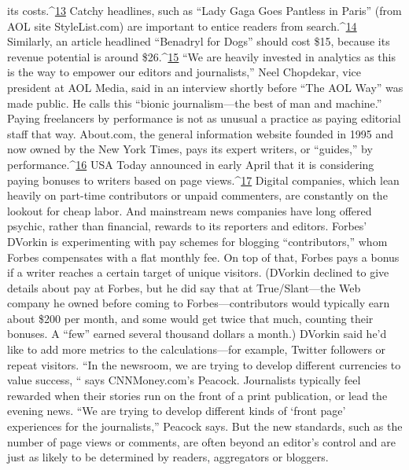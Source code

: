 its costs.^{\href{#endnotes-ch9}{13}} Catchy headlines, such as ``Lady Gaga Goes Pantless in Paris'' (from
AOL site StyleList.com) are important to entice readers from search.^{\href{#endnotes-ch9}{14}} Similarly,
an article headlined ``Benadryl for Dogs'' should cost \$15, because its revenue
potential is around \$26.^{\href{#endnotes-ch9}{15}} ``We are heavily invested in analytics as this is the way
to empower our editors and journalists,'' Neel Chopdekar, vice president at AOL
Media, said in an interview shortly before ``The AOL Way'' was made public. He
calls this ``bionic journalism—the best of man and machine.''
Paying freelancers by performance is not as unusual a practice as paying editorial
staff that way. About.com, the general information website founded in 1995
and now owned by the New York Times, pays its expert writers, or ``guides,'' by
performance.^{\href{#endnotes-ch9}{16}} USA Today announced in early April that it is considering paying
bonuses to writers based on page views.^{\href{#endnotes-ch9}{17}}
Digital companies, which lean heavily on part-time contributors or unpaid
commenters, are constantly on the lookout for cheap labor. And mainstream
news companies have long offered psychic, rather than financial, rewards to its
reporters and editors.
Forbes’ DVorkin is experimenting with pay schemes for blogging ``contributors,''
whom Forbes compensates with a flat monthly fee. On top of that, Forbes
pays a bonus if a writer reaches a certain target of unique visitors. (DVorkin declined
to give details about pay at Forbes, but he did say that at True/Slant—the
Web company he owned before coming to Forbes—contributors would typically
earn about \$200 per month, and some would get twice that much, counting
their bonuses. A ``few'' earned several thousand dollars a month.) DVorkin said
he’d like to add more metrics to the calculations—for example, Twitter followers
or repeat visitors.
``In the newsroom, we are trying to develop different currencies to value success,
“ says CNNMoney.com’s Peacock. Journalists typically feel rewarded when
their stories run on the front of a print publication, or lead the evening news.
“We are trying to develop different kinds of ‘front page’ experiences for the
journalists,'' Peacock says. But the new standards, such as the number of page
views or comments, are often beyond an editor’s control and are just as likely to
be determined by readers, aggregators or bloggers.

